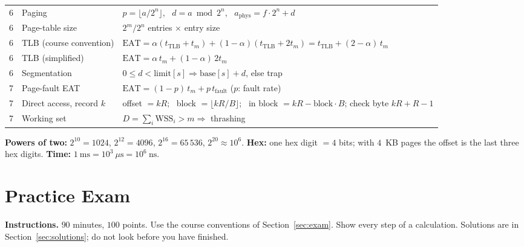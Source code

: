 \documentclass[11pt,a4paper]{article}
\begin{document}
\begin{center}
\begin{tabularx}{\linewidth}{@{}c >{\raggedright\arraybackslash}p{4.3cm} >{\raggedright\arraybackslash}X@{}}
6 & Paging & $p = \lfloor a / 2^{n}\rfloor$, \ $d = a \bmod 2^{n}$, \ $a_{\text{phys}} = f\cdot 2^{n} + d$ \\
6 & Page-table size & $2^{m}/2^{n}$ entries $\times$ entry size \\
6 & TLB (course convention) & $\text{EAT} = \alpha(t_{\text{TLB}} + t_m) + (1-\alpha)(t_{\text{TLB}} + 2t_m) = t_{\text{TLB}} + (2-\alpha)\,t_m$ \\
6 & TLB (simplified) & $\text{EAT} = \alpha\,t_m + (1-\alpha)\,2t_m$ \\
6 & Segmentation & $0 \le d < \text{limit}[s] \Rightarrow \text{base}[s] + d$, else trap \\
7 & Page-fault EAT & $\text{EAT} = (1-p)\,t_m + p\,t_{\text{fault}}$ \quad ($p$: fault rate) \\
7 & Direct access, record $k$ & offset $= kR$; \ block $= \lfloor kR/B \rfloor$; \ in block $= kR - \text{block}\cdot B$; check byte $kR + R - 1$ \\
7 & Working set & $D = \sum_i \text{WSS}_i > m \Rightarrow$ thrashing \\
\bottomrule
\end{tabularx}
\end{center}
\textbf{Powers of two:} $2^{10} = 1024$, $2^{12} = 4096$, $2^{16} = 65\,536$, $2^{20} \approx 10^{6}$. \textbf{Hex:} one hex digit $= 4$ bits; with $4$~KB pages the offset is the last three hex digits. \textbf{Time:} $1\ \text{ms} = 10^{3}\ \mu\text{s} = 10^{6}\ \text{ns}$.
\newpage

\section{Practice Exam}
\label{sec:practice}
\textbf{Instructions.} $90$ minutes, $100$ points. Use the course conventions of Section~\ref{sec:exam}. Show every step of a calculation. Solutions are in Section~\ref{sec:solutions}; do not look before you have finished.
\end{document}
